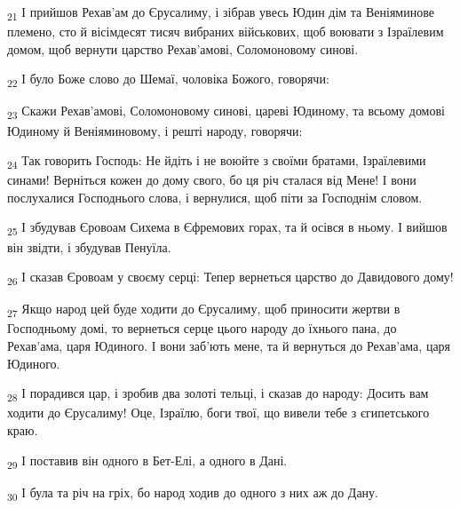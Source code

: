 \begin{tcolorbox}
\textsubscript{21} І прийшов Рехав'ам до Єрусалиму, і зібрав увесь Юдин дім та Веніяминове племено, сто й вісімдесят тисяч вибраних військових, щоб воювати з Ізраїлевим домом, щоб вернути царство Рехав'амові, Соломоновому синові.
\end{tcolorbox}
\begin{tcolorbox}
\textsubscript{22} І було Боже слово до Шемаї, чоловіка Божого, говорячи:
\end{tcolorbox}
\begin{tcolorbox}
\textsubscript{23} Скажи Рехав'амові, Соломоновому синові, цареві Юдиному, та всьому домові Юдиному й Веніяминовому, і решті народу, говорячи:
\end{tcolorbox}
\begin{tcolorbox}
\textsubscript{24} Так говорить Господь: Не йдіть і не воюйте з своїми братами, Ізраїлевими синами! Верніться кожен до дому свого, бо ця річ сталася від Мене! І вони послухалися Господнього слова, і вернулися, щоб піти за Господнім словом.
\end{tcolorbox}
\begin{tcolorbox}
\textsubscript{25} І збудував Єровоам Сихема в Єфремових горах, та й осівся в ньому. І вийшов він звідти, і збудував Пенуїла.
\end{tcolorbox}
\begin{tcolorbox}
\textsubscript{26} І сказав Єровоам у своєму серці: Тепер вернеться царство до Давидового дому!
\end{tcolorbox}
\begin{tcolorbox}
\textsubscript{27} Якщо народ цей буде ходити до Єрусалиму, щоб приносити жертви в Господньому домі, то вернеться серце цього народу до їхнього пана, до Рехав'ама, царя Юдиного. І вони заб'ють мене, та й вернуться до Рехав'ама, царя Юдиного.
\end{tcolorbox}
\begin{tcolorbox}
\textsubscript{28} І порадився цар, і зробив два золоті тельці, і сказав до народу: Досить вам ходити до Єрусалиму! Оце, Ізраїлю, боги твої, що вивели тебе з єгипетського краю.
\end{tcolorbox}
\begin{tcolorbox}
\textsubscript{29} І поставив він одного в Бет-Елі, а одного в Дані.
\end{tcolorbox}
\begin{tcolorbox}
\textsubscript{30} І була та річ на гріх, бо народ ходив до одного з них аж до Дану.
\end{tcolorbox}
